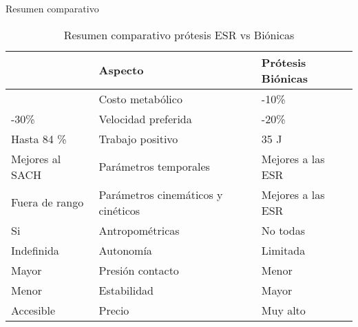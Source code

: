 \documentclass[10pt]{beamer}
\begin{document}
\begin{frame}{Resumen comparativo}

\begin{table}
\begin{centering}
\begin{tabular}{|>{\centering}p{24mm}|>{\centering}p{45mm}|>{\centering}p{24mm}|}
\hline 
{\footnotesize{}Prótesis ESR} & {\footnotesize{}Aspecto} & {\footnotesize{}Prótesis Biónicas}\tabularnewline
\hline 
\hline 
{\footnotesize{}-25\%} & {\footnotesize{}Costo metabólico} & {\footnotesize{}-10\%}\tabularnewline
\hline 
{\footnotesize{}-30\%} & {\footnotesize{}Velocidad preferida} & {\footnotesize{}-20\%}\tabularnewline
\hline 
{\footnotesize{}Hasta 84 \%} & {\footnotesize{}Trabajo positivo} & {\footnotesize{}35 J}\tabularnewline
\hline 
{\footnotesize{}Mejores al SACH} & {\footnotesize{}Parámetros temporales} & {\footnotesize{}Mejores a las ESR}\tabularnewline
\hline 
{\footnotesize{}Fuera de rango} & {\footnotesize{}Parámetros cinemáticos y cinéticos} & {\footnotesize{}Mejores a las ESR}\tabularnewline
\hline 
{\footnotesize{}Si} & {\footnotesize{}Antropométricas} & {\footnotesize{}No todas}\tabularnewline
\hline 
{\footnotesize{}Indefinida} & {\footnotesize{}Autonomía} & {\footnotesize{}Limitada}\tabularnewline
\hline 
{\footnotesize{}Mayor} & {\footnotesize{}Presión contacto} & {\footnotesize{}Menor}\tabularnewline
\hline 
{\footnotesize{}Menor} & {\footnotesize{}Estabilidad} & {\footnotesize{}Mayor}\tabularnewline
\hline 
{\footnotesize{}Accesible} & {\footnotesize{}Precio} & {\footnotesize{}Muy alto}\tabularnewline
\hline 
\end{tabular}
\par\end{centering}
\caption{Resumen comparativo prótesis ESR vs Biónicas}

\end{table}

\end{frame}
\end{document}

